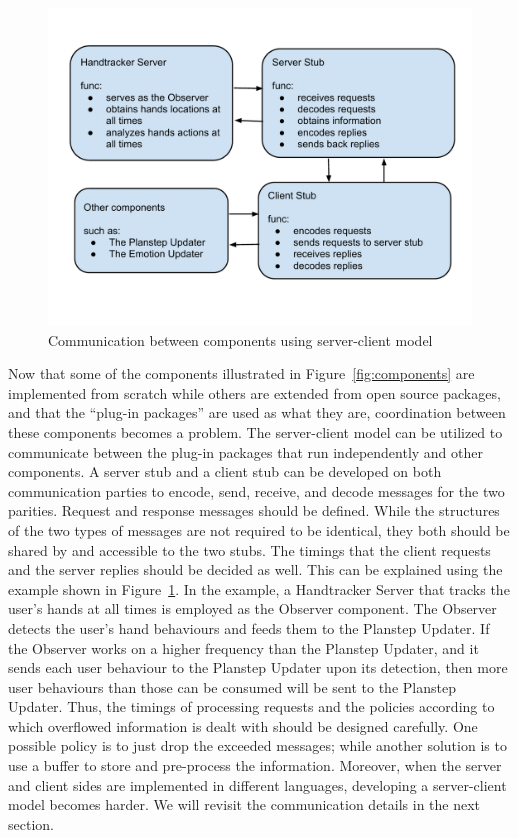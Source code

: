 \begin{figure}[p]
\centering
\includegraphics[width=\linewidth]{fig-communication.pdf}
\caption{Communication between components using server-client model}
\label{fig:communication}
\end{figure}

Now that some of the components illustrated in Figure~\ref{fig:components} are implemented from scratch while others are extended from open source packages, and that the ``plug-in packages'' are used as what they are, coordination between these components becomes a problem. The server-client model can be utilized to communicate between the plug-in packages that run independently and other components. A server stub and a client stub can be developed on both communication parties to encode, send, receive, and decode messages for the two parities. Request and response messages should be defined. While the structures of the two types of messages are not required to be identical, they both should be shared by and accessible to the two stubs. The timings that the client requests and the server replies should be decided as well. This can be explained using the example shown in Figure~\ref{fig:communication}. In the example, a Handtracker Server that tracks the user's hands at all times is employed as the Observer component. The Observer detects the user's hand behaviours and feeds them to the Planstep Updater. If the Observer works on a higher frequency than the Planstep Updater, and it sends each user behaviour to the Planstep Updater upon its detection, then more user behaviours than those can be consumed will be sent to the Planstep Updater. Thus, the timings of processing requests and the policies according to which overflowed information is dealt with should be designed carefully. One possible policy is to just drop the exceeded messages; while another solution is to use a buffer to store and pre-process the information. Moreover, when the server and client sides are implemented in different languages, developing a server-client model becomes harder. We will revisit the communication details in the next section.

